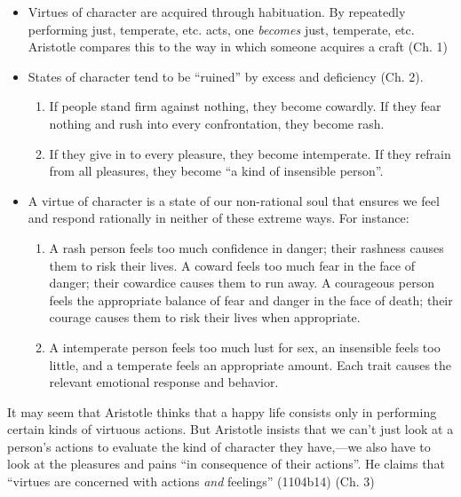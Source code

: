 \documentclass[oneside]{article}
\begin{document}
\begin{itemize}
\item Virtues of character are acquired through habituation. By repeatedly performing just, temperate, etc. acts, one \emph{becomes} just, temperate, etc. Aristotle compares this to the way in which someone acquires a craft (Ch. 1)
\item States of character tend to be ``ruined'' by excess and deficiency (Ch. 2).
\begin{enumerate}
\item If people stand firm against nothing, they become cowardly. If they fear nothing and rush into every confrontation, they become rash. 
\item If they give in to every pleasure, they become intemperate. If they refrain from all pleasures, they become ``a kind of insensible person''.
\end{enumerate}
\item A virtue of character is a state of our non-rational soul that ensures we feel and respond rationally in neither of these extreme ways. For instance:  
\begin{enumerate}
\item A rash person feels too much confidence in danger; their rashness causes them to risk their lives. A coward feels too much fear in the face of danger; their cowardice causes them to run away. A courageous person feels the appropriate balance of fear and danger in the face of death; their courage causes them to risk their lives when appropriate.
\item A intemperate person feels too much lust for sex, an insensible feels too little, and a temperate feels an appropriate amount. Each trait causes the relevant emotional response and behavior. 
\end{enumerate}
\end{itemize}

It may seem that Aristotle thinks that a happy life consists only in performing certain kinds of virtuous actions. But Aristotle insists that we can't just look at a person's actions to evaluate the kind of character they have,---we also have to look at the pleasures and pains ``in consequence of their actions''. He claims that ``virtues are concerned with actions \emph{and} feelings'' (1104b14) (Ch. 3)
\end{document}

